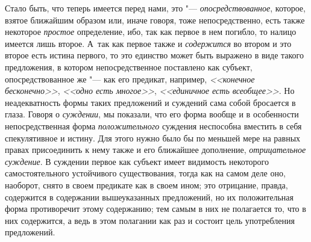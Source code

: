 {{Стало быть, что теперь имеется перед нами, это "--- {\em опосредствованное},
которое, взятое ближайшим образом или, иначе говоря, тоже
непосредственно, есть также некоторое {\em простое}
определение, ибо, так как первое в нем погибло, то налицо
имеется лишь второе. А~так как первое также и {\em содержится} во
втором и это второе есть истина первого, то это единство может быть
выражено в виде такого предложения, в котором
непосредственное поставлено как субъект, опосредствованное же
"--- как его предикат, например, {\em <<конечное бесконечно>>},
{\em <<одно есть многое>>}, {\em <<единичное есть всеобщее>>}.
Но неадекватность формы таких предложений и суждений сама
собой бросается в глаза. Говоря о {\em суждении}, мы
показали, что его форма вообще и в особенности непосредственная форма
{\em положительного}
суждения неспособна вместить в себя спекулятивное и истину.
Для этого нужно было бы по меньшей мере на равных правах присоединить к
нему также и его ближайшее дополнение,
{\em отрицательное суждение}.
В суждении первое как субъект имеет видимость некоторого
самостоятельного устойчивого существования, тогда как на самом деле оно,
наоборот, снято в своем предикате как в своем ином; это отрицание,
правда, содержится в содержании вышеуказанных предложений, но их
положительная форма противоречит этому содержанию; тем самым в них не
полагается то, что в них содержится, а ведь в этом полагании как раз и
состоит цель употребления предложений.

}}
